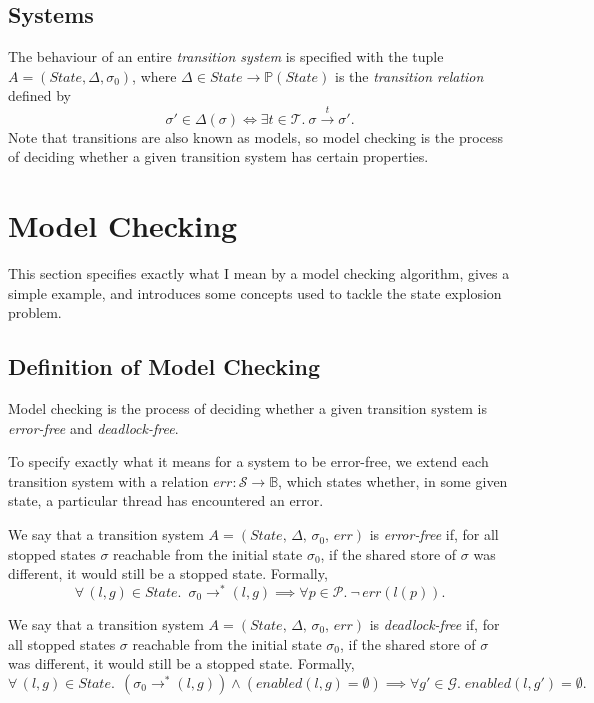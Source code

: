 \documentclass[12pt,a4paper,twoside,openright]{report}
\begin{document}
\subsection{Systems}
The behaviour of an entire \emph{transition system} is
specified with the tuple $A = (\textit{State}, \Delta, \sigma_0)$,
where $\Delta \in State \to \mathbb{P}(State)$
is the \emph{transition relation} defined by
\[
	\sigma' \in \Delta(\sigma) \iff
	\exists t \in \mathcal{T}. \ \sigma \xrightarrow{t} \sigma'.
\]
Note that transitions are also known as models,
so model checking is the process of deciding
whether a given transition system has certain
properties.

\section{Model Checking}
This section specifies exactly what I mean by
a model checking algorithm, gives a simple
example, and introduces some concepts used
to tackle the state explosion problem.

\subsection{Definition of Model Checking}
\label{sec:model-checking-dfn}
Model checking is the process of deciding
whether a
given transition system is \emph{error-free} and
\emph{deadlock-free}.

To specify exactly what it means for a system to
be error-free, we extend each transition system
with a relation
$\textit{err} : \mathcal{S} \to \mathbb{B}$, which states
whether, in some given state, a particular
thread has encountered an error.

We say that a transition system
$A = (\textit{State},\, \Delta,\, \sigma_0,\, \textit{err})$
is
\emph{error-free} if, for all stopped
states $\sigma$ reachable from
the initial state $\sigma_0$, if the shared store of
$\sigma$ was different, it would still be a stopped state.
Formally,
\[
	\forall\, (l, g) \in \textit{State}.\; \ \sigma_0 \longrightarrow^* (l, g)
	\implies \forall p \in \mathcal{P}.\ \neg\,\textit{err}(l(p)).
\]

We say that a transition system
$A = (\textit{State},\, \Delta,\, \sigma_0,\, \textit{err})$
is \textit{deadlock-free} if, for all stopped states
$\sigma$ reachable from
the initial state $\sigma_0$, if the shared store of
$\sigma$ was different, it would still be a stopped state.
Formally,
\[
	\forall\, (l, g) \in \textit{State}. \;\, (\sigma_0
	 \longrightarrow^* (l, g))
	\wedge (\textit{enabled}(l, g) = \emptyset)
	\implies \forall g' \in \mathcal{G}. \;
		\textit{enabled}(l, g') = \emptyset.
\]
\end{document}
